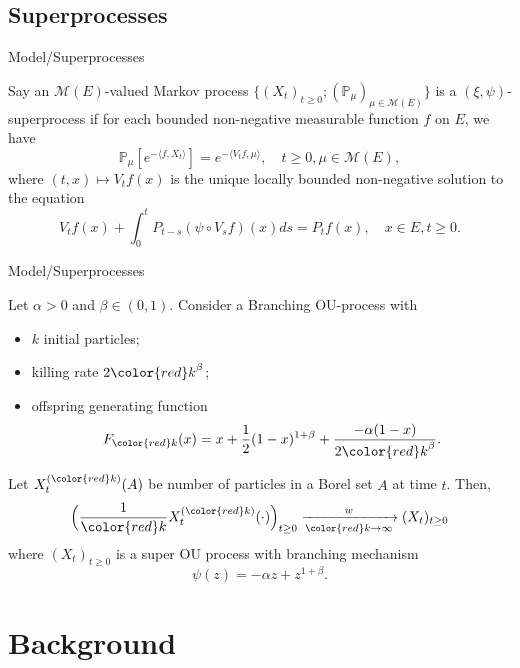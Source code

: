 \documentclass[xcolor=dvipsnames]{beamer}
\begin{document}
\subsection{Superprocesses}
\begin{frame}{Model/Superprocesses}
\begin{definition}[Superprocess]
	Say an $\mathcal M(E)$-valued Markov process $\{(X_t)_{t\geq 0}; (\mathbb P_\mu)_{\mu\in \mathcal M(E)}\}$ is a $(\xi,\psi)$-superprocess if for each bounded non-negative measurable function $f$ on $E$, we have
\begin{equation}
\label{eq: def of V_t}
    \mathbb{P}_{\mu}[e^{-\langle f,X_t \rangle}]
    = e^{-\langle V_tf, \mu \rangle},
    \quad t\geq 0, \mu \in \mathcal M(E),
\end{equation}
	where $(t,x) \mapsto V_tf(x)$ is the unique locally bounded non-negative solution to the equation
\begin{equation}
	V_tf(x) +  \int_0^t P_{t-s}(\psi \circ V_{s}f)(x)ds
	= P_tf(x),
    \quad x\in E, t\geq 0.
\end{equation}
\end{definition}
\end{frame}

\begin{frame}{Model/Superprocesses}
\begin{example}
	Let $\alpha >0$ and $\beta \in (0,1)$.
	Consider a Branching OU-process with
\begin{itemize}
\item
	{\color{red} $k$} initial particles;
\item
	killing rate  $2{\color{red}k}^\beta$;
\item
	offspring generating function
\[
	F_{\color{red}k}(x) =x +\frac{1}{2}(1-x)^{1+\beta} + \frac{-\alpha (1-x)}{2{\color{red}k}^\beta}.
\]
\end{itemize}
	Let $X^{({\color{red} k})}_t(A)$ be number of particles in a Borel set $A$ at time $t$. 
	Then,
\[
	\Big(\frac{1}{\color{red} k} X^{({\color{red} k})}_t(\cdot)\Big)_{t\geq 0}
	\xrightarrow[{\color{red}k}\to \infty]{w} (X_t)_{t\geq 0}
\]
where $(X_t)_{t\geq 0}$ is a super OU process with branching mechanism \[\psi(z) = -\alpha z + z^{1+\beta}.\]
\end{example}
\end{frame}

\section{Background}
\end{document}

